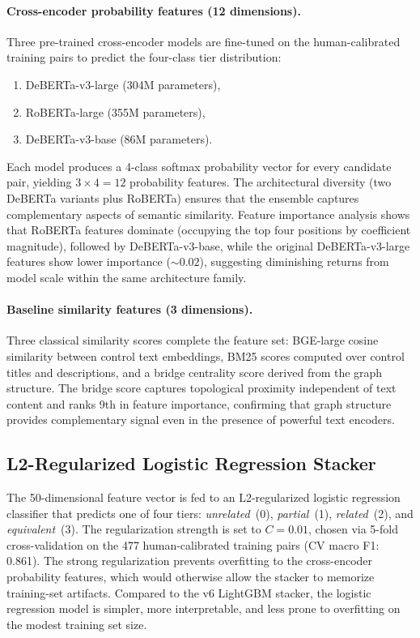 \paragraph{Cross-encoder probability features (12 dimensions).}
Three pre-trained cross-encoder models are fine-tuned on the
human-calibrated training pairs to predict the four-class tier
distribution:
\begin{enumerate}
    \item DeBERTa-v3-large (304M parameters),
    \item RoBERTa-large (355M parameters),
    \item DeBERTa-v3-base (86M parameters).
\end{enumerate}
Each model produces a 4-class softmax probability vector for every
candidate pair, yielding $3 \times 4 = 12$ probability features. The
architectural diversity (two DeBERTa variants plus RoBERTa) ensures
that the ensemble captures complementary aspects of semantic similarity.
Feature importance analysis shows that RoBERTa features dominate
(occupying the top four positions by coefficient magnitude), followed by
DeBERTa-v3-base, while the original DeBERTa-v3-large features show
lower importance (${\sim}0.02$), suggesting diminishing returns from
model scale within the same architecture family.

\paragraph{Baseline similarity features (3 dimensions).}
Three classical similarity scores complete the feature set:
BGE-large cosine similarity between control text embeddings,
BM25 scores computed over control titles and descriptions, and
a bridge centrality score derived from the graph structure. The bridge
score captures topological proximity independent of text content and
ranks 9th in feature importance, confirming that graph structure
provides complementary signal even in the presence of powerful text
encoders.

\subsection{L2-Regularized Logistic Regression Stacker}

The 50-dimensional feature vector is fed to an L2-regularized
logistic regression classifier that predicts one of four tiers:
\emph{unrelated}~(0), \emph{partial}~(1), \emph{related}~(2), and
\emph{equivalent}~(3). The regularization strength is set to
$C = 0.01$, chosen via 5-fold cross-validation on the 477
human-calibrated training pairs (CV macro F1: 0.861). The strong
regularization prevents overfitting to the cross-encoder probability
features, which would otherwise allow the stacker to memorize
training-set artifacts. Compared to the v6 LightGBM stacker, the
logistic regression model is simpler, more interpretable, and less
prone to overfitting on the modest training set size.

